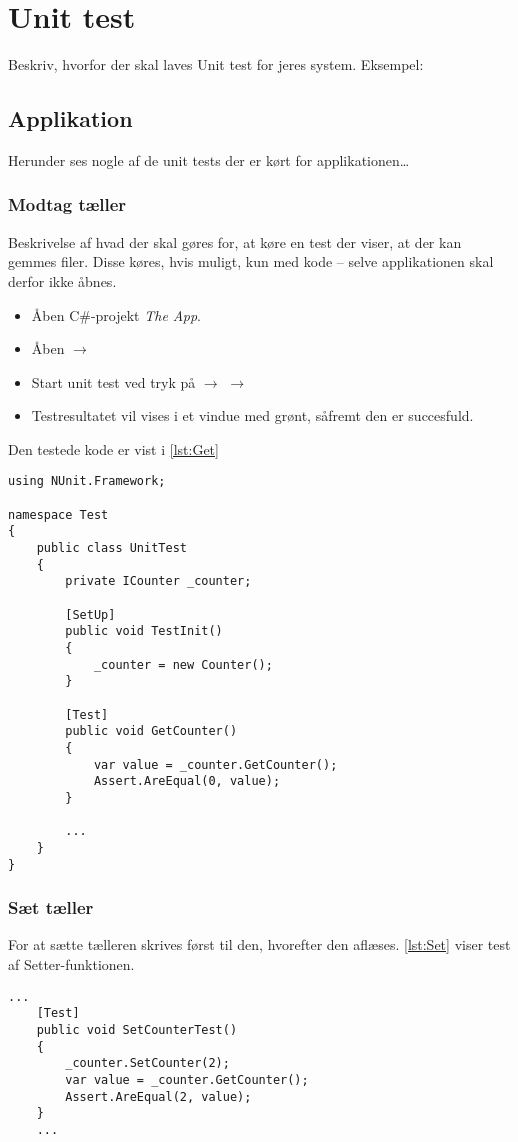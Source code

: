 \documentclass[Main]{subfiles}
\begin{document}
\chapter{Unit test}
Beskriv, hvorfor der skal laves Unit test for jeres system.
Eksempel:

\section{Applikation}
Herunder ses nogle af de unit tests der er kørt for applikationen\dots

\subsection{Modtag tæller}
Beskrivelse af hvad der skal gøres for, at køre en test der viser, at der kan gemmes filer. 
Disse køres, hvis muligt, kun med kode -- selve applikationen skal derfor ikke åbnes.

\begin{itemize}
\item Åben C\#-projekt \textit{The App}.
\item Åben  $\rightarrow$ 
\item Start unit test ved tryk på  $\rightarrow$  $\rightarrow$ 
\item Testresultatet vil vises i et vindue med grønt, såfremt den er succesfuld.
\end{itemize}

Den testede kode er vist i \codeTitle \ref{lst:Get}

\begin{lstlisting}[caption=Returnering af counter, style=Code-C++, label=lst:Get]
using NUnit.Framework;

namespace Test
{
	public class UnitTest
	{
		private ICounter _counter;

		[SetUp]
		public void TestInit()
		{	
			_counter = new Counter();
		}

		[Test]
		public void GetCounter()
		{
			var value = _counter.GetCounter();
			Assert.AreEqual(0, value);
		}
		
		...
	}
}
\end{lstlisting}



\subsection{Sæt tæller}
For at sætte tælleren skrives først til den, hvorefter den aflæses.
\codeTitle \ref{lst:Set} viser test af Setter-funktionen.
\begin{lstlisting}[caption=Setter-funktion, style=Code-C, label=lst:Set]
	...
	[Test]
	public void SetCounterTest()
	{
		_counter.SetCounter(2);
		var value = _counter.GetCounter();
		Assert.AreEqual(2, value);
	}
	...
\end{lstlisting}
\end{document}
